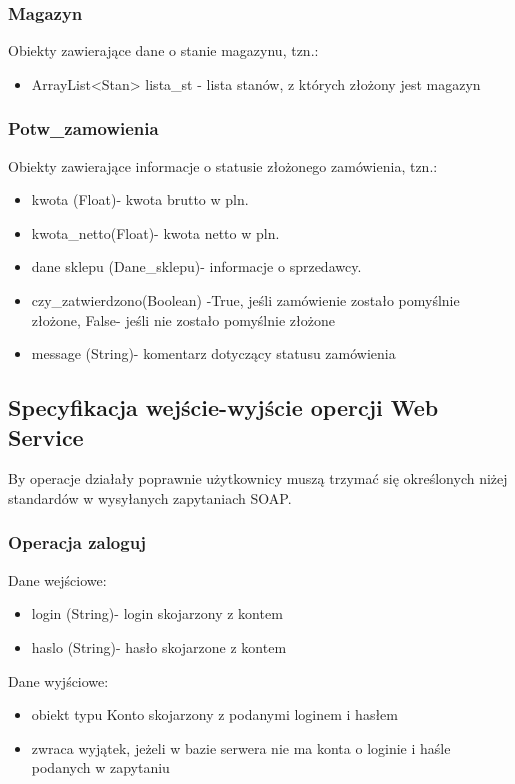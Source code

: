 \documentclass[11pt]{article}   %
\begin{document}
\subsubsection{Magazyn}
Obiekty zawierające dane o stanie magazynu, tzn.:
\begin{itemize}
	\item ArrayList<Stan> lista\_st - lista stanów, z których złożony jest magazyn
\end{itemize}

\subsubsection{Potw\_zamowienia}
Obiekty zawierające informacje o statusie złożonego zamówienia, tzn.:
\begin{itemize}
	\item kwota (Float)- kwota brutto w pln.
	\item kwota\_netto(Float)- kwota netto w pln.
	\item dane sklepu (Dane\_sklepu)- informacje o sprzedawcy.
	\item czy\_zatwierdzono(Boolean) -True, jeśli zamówienie zostało pomyślnie złożone, False- jeśli nie zostało pomyślnie złożone
	\item message (String)- komentarz dotyczący statusu zamówienia
\end{itemize}
\subsection{Specyfikacja wejście-wyjście opercji Web Service}
By operacje działały poprawnie użytkownicy muszą trzymać się określonych niżej standardów w wysyłanych zapytaniach SOAP.
\subsubsection{Operacja zaloguj}
Dane wejściowe:
\begin{itemize}
	\item login (String)- login skojarzony z kontem
	\item haslo (String)- hasło skojarzone z kontem
\end{itemize}	
Dane wyjściowe:
\begin{itemize}
	\item obiekt typu Konto skojarzony z podanymi loginem i hasłem
	\item zwraca wyjątek, jeżeli w bazie serwera nie ma konta o loginie i haśle podanych w zapytaniu
\end{itemize}

\end{document}
